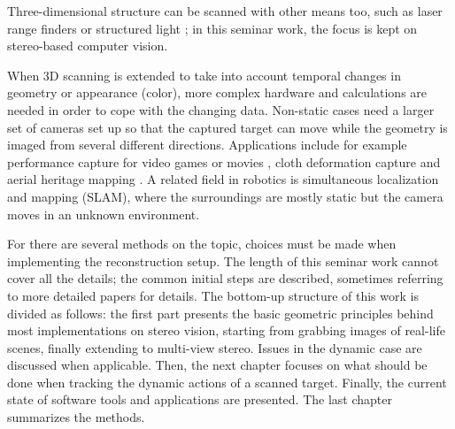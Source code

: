 Three-dimensional structure can be scanned with other means too, such as laser range finders \cite{levoy2000digital} or  structured light \cite{rocchini2001low}; in this seminar work, the focus is kept on stereo-based computer vision.

When 3D scanning is extended to take into account temporal changes in geometry or appearance (color), more complex hardware and calculations are needed in order to cope with the changing data.
Non-static cases need a larger set of cameras set up so that the captured target can move while the geometry is imaged from several different directions.
Applications include for example performance capture for video games or movies \cite{bradley2010high}, cloth deformation capture \cite{pritchard2003cloth} and aerial heritage mapping \cite{remondino2011heritage}.
A related field in robotics is simultaneous localization and mapping (SLAM), where the surroundings are mostly static but the camera moves in an unknown environment. \cite{durrant2006simultaneous}

For there are several methods on the topic, choices must be made when implementing the reconstruction setup.
The length of this seminar work cannot cover all the details; the common initial steps are described, sometimes referring to more detailed papers for details.
The bottom-up structure of this work is divided as follows: the first part presents the basic geometric principles behind most implementations on stereo vision, starting from grabbing images of real-life scenes, finally extending to multi-view stereo.
Issues in the dynamic case are discussed when applicable.
Then, the next chapter focuses on what should be done when tracking the dynamic actions of a scanned target.
Finally, the current state of software tools and applications are presented. The last chapter summarizes the methods.
